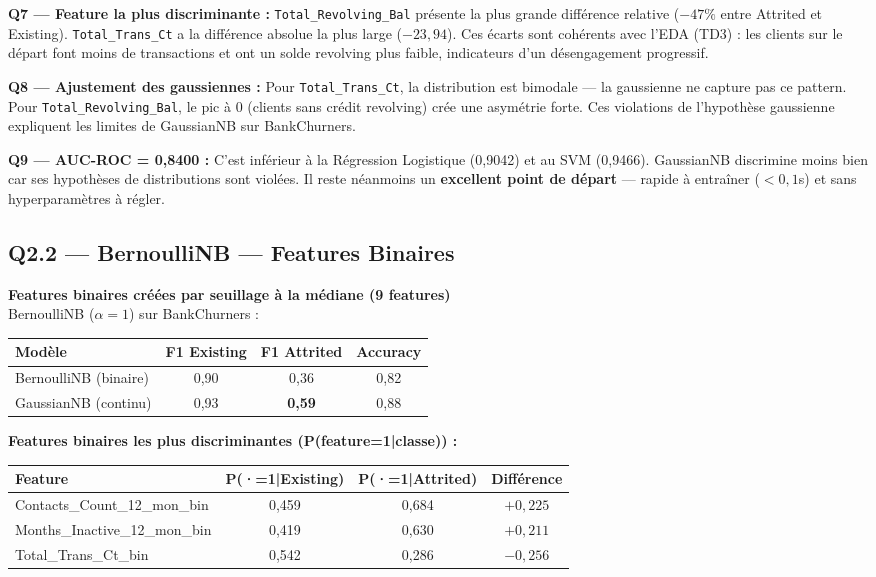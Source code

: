 \documentclass[12pt,a4paper]{article}
\begin{document}
\begin{reponsebox}
\textbf{Q7 — Feature la plus discriminante :}
\texttt{Total\_Revolving\_Bal} présente la plus grande différence relative ($-47\%$ entre Attrited et Existing). \texttt{Total\_Trans\_Ct} a la différence absolue la plus large ($-23{,}94$). Ces écarts sont cohérents avec l'EDA (TD3) : les clients sur le départ font moins de transactions et ont un solde revolving plus faible, indicateurs d'un désengagement progressif.

\textbf{Q8 — Ajustement des gaussiennes :}
Pour \texttt{Total\_Trans\_Ct}, la distribution est bimodale — la gaussienne ne capture pas ce pattern. Pour \texttt{Total\_Revolving\_Bal}, le pic à 0 (clients sans crédit revolving) crée une asymétrie forte. Ces violations de l'hypothèse gaussienne expliquent les limites de GaussianNB sur BankChurners.

\textbf{Q9 — AUC-ROC = 0{,}8400 :}
C'est inférieur à la Régression Logistique (0{,}9042) et au SVM (0{,}9466). GaussianNB discrimine moins bien car ses hypothèses de distributions sont violées. Il reste néanmoins un \textbf{excellent point de départ} — rapide à entraîner ($< 0{,}1$s) et sans hyperparamètres à régler.
\end{reponsebox}

\subsection{Q2.2 — BernoulliNB — Features Binaires}

\begin{resultbox}
\textbf{Features binaires créées par seuillage à la médiane (9 features)} \\
BernoulliNB ($\alpha=1$) sur BankChurners :
\begin{center}
\begin{tabular}{lccc}
\toprule
\textbf{Modèle} & \textbf{F1 Existing} & \textbf{F1 Attrited} & \textbf{Accuracy} \\
\midrule
BernoulliNB (binaire) & 0{,}90 & 0{,}36 & 0{,}82 \\
GaussianNB (continu)  & 0{,}93 & \textbf{0{,}59} & 0{,}88 \\
\bottomrule
\end{tabular}
\end{center}

\textbf{Features binaires les plus discriminantes (P(feature=1|classe)) :}
\begin{center}
\begin{tabular}{lccc}
\toprule
\textbf{Feature} & \textbf{P(·=1|Existing)} & \textbf{P(·=1|Attrited)} & \textbf{Différence} \\
\midrule
Contacts\_Count\_12\_mon\_bin & 0{,}459 & 0{,}684 & $+0{,}225$ \\
Months\_Inactive\_12\_mon\_bin & 0{,}419 & 0{,}630 & $+0{,}211$ \\
Total\_Trans\_Ct\_bin & 0{,}542 & 0{,}286 & $-0{,}256$ \\
\bottomrule
\end{tabular}
\end{center}
\end{resultbox}
\end{document}
